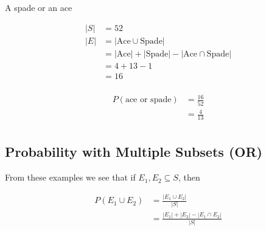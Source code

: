 \documentclass[../../Main.tex]{subfiles}
\begin{document}
\begin{example}
\begin{enumerate}
{\begin{alphabet}
                \item 
                {
                    A spade or an ace

                    \begin{align*}
                        |S| &= 52 \\
                        |E| &= |\text{Ace} \cup \text{Spade}| \\
                        &= |\text{Ace}| + |\text{Spade}| - |\text{Ace} \cap \text{Spade}| \\
                        &= 4 + 13 - 1 \\
                        &= 16 \\
                    \end{align*}

                    \begin{align*}
                        P(\text{ace or spade}) &= \frac{16}{52} \\
                        &= \boxed{\frac{4}{13}} \\
                    \end{align*}
                }
            \end{alphabet}
        }
    \end{enumerate}
\end{example}

\subsection{Probability with Multiple Subsets (OR)}

From these examples we see that if $E_1, E_2 \subseteq S$, then

\begin{align*}
    P(E_1 \cup E_2) &= \frac{|E_1 \cup E_2|}{|S|} \\
    &= \frac{|E_1| + |E_2| - |E_1 \cap E_2|}{|S|} \\
\end{align*}

\end{document}
